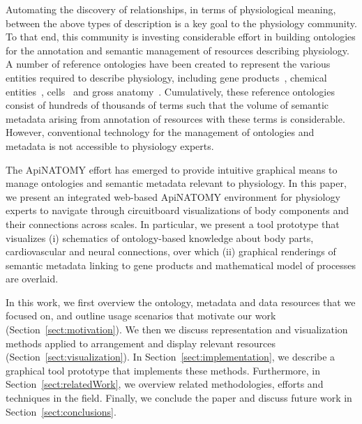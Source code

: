 Automating the discovery of relationships, in terms of physiological meaning, between the above types of description is a key goal to the physiology community. To that end, this community is investing considerable effort in building ontologies for the annotation and semantic management of resources describing physiology. A number of reference ontologies have been created to represent the various entities required to describe physiology, including gene products~\cite{Bla+13}, chemical entities~\cite{HMD+13}, cells~\cite{BRA05} and gross anatomy~\cite{RM03}. Cumulatively, these reference ontologies consist of hundreds of thousands of terms such that the volume of semantic metadata arising from annotation of resources with these terms is considerable. However, conventional technology for the management of ontologies and metadata is not accessible to physiology experts.

The ApiNATOMY effort has emerged to provide intuitive graphical means to manage ontologies and semantic metadata relevant to physiology. In this paper, we present an integrated web-based ApiNATOMY environment for physiology experts to navigate through circuitboard visualizations of body components and their connections across scales. In particular, we present a tool prototype that visualizes (i) schematics of ontology-based knowledge about body parts, cardiovascular and neural connections, over which (ii) graphical renderings of semantic metadata linking to gene products and mathematical model of processes are overlaid.

In this work, we first overview the ontology, metadata and data resources that we focused on, and outline usage scenarios that motivate our work (Section~\ref{sect:motivation}).  We then we discuss representation and visualization methods applied to arrangement and display relevant resources (Section~\ref{sect:visualization}). In Section~\ref{sect:implementation}, we describe a graphical tool prototype that implements these methods. Furthermore, in Section~\ref{sect:relatedWork}, we overview related methodologies, efforts and techniques in the field. Finally, we conclude the paper and discuss future work in Section~\ref{sect:conclusions}.